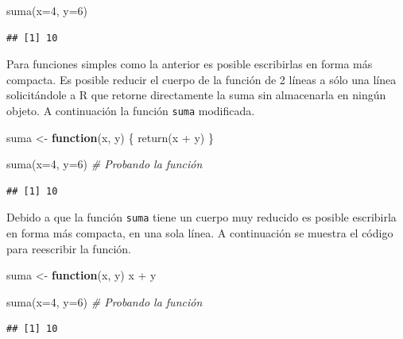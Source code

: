 \documentclass[
]{book}
\makeatletter
\newenvironment{Shaded}{\begin{snugshade}}{\end{snugshade}}
\newcommand{\AttributeTok}[1]{\textcolor[rgb]{0.77,0.63,0.00}{#1}}
\newcommand{\CommentTok}[1]{\textcolor[rgb]{0.56,0.35,0.01}{\textit{#1}}}
\newcommand{\ControlFlowTok}[1]{\textcolor[rgb]{0.13,0.29,0.53}{\textbf{#1}}}
\newcommand{\DecValTok}[1]{\textcolor[rgb]{0.00,0.00,0.81}{#1}}
\newcommand{\FunctionTok}[1]{\textcolor[rgb]{0.00,0.00,0.00}{#1}}
\newcommand{\NormalTok}[1]{#1}
\newcommand{\OtherTok}[1]{\textcolor[rgb]{0.56,0.35,0.01}{#1}}
\newcommand{\SpecialCharTok}[1]{\textcolor[rgb]{0.00,0.00,0.00}{#1}}
\newenvironment{kframe}{%
\medskip{}
\setlength{\fboxsep}{.8em}
 \def\at@end@of@kframe{}%
 \ifinner\ifhmode%
  \def\at@end@of@kframe{\end{minipage}}%
  \begin{minipage}{\columnwidth}%
 \fi\fi%
 \def\FrameCommand##1{\hskip\@totalleftmargin \hskip-\fboxsep
 \colorbox{shadecolor}{##1}\hskip-\fboxsep
     \hskip-\linewidth \hskip-\@totalleftmargin \hskip\columnwidth}%
 \MakeFramed {\advance\hsize-\width
   \@totalleftmargin\z@ \linewidth\hsize
   \@setminipage}}%
 {\par\unskip\endMakeFramed%
 \at@end@of@kframe}
\renewenvironment{Shaded}{\begin{kframe}}{\end{kframe}}
\makeatother
\begin{document}
\begin{Shaded}
\begin{Highlighting}[]
\FunctionTok{suma}\NormalTok{(}\AttributeTok{x=}\DecValTok{4}\NormalTok{, }\AttributeTok{y=}\DecValTok{6}\NormalTok{)}
\end{Highlighting}
\end{Shaded}

\begin{verbatim}
## [1] 10
\end{verbatim}

Para funciones simples como la anterior es posible escribirlas en forma más compacta. Es posible reducir el cuerpo de la función de 2 líneas a sólo una línea solicitándole a R que retorne directamente la suma sin almacenarla en ningún objeto. A continuación la función \texttt{suma} modificada.

\begin{Shaded}
\begin{Highlighting}[]
\NormalTok{suma }\OtherTok{\textless{}{-}} \ControlFlowTok{function}\NormalTok{(x, y) \{}
  \FunctionTok{return}\NormalTok{(x }\SpecialCharTok{+}\NormalTok{ y)}
\NormalTok{\}}

\FunctionTok{suma}\NormalTok{(}\AttributeTok{x=}\DecValTok{4}\NormalTok{, }\AttributeTok{y=}\DecValTok{6}\NormalTok{)  }\CommentTok{\# Probando la función}
\end{Highlighting}
\end{Shaded}

\begin{verbatim}
## [1] 10
\end{verbatim}

Debido a que la función \texttt{suma} tiene un cuerpo muy reducido es posible escribirla en forma más compacta, en una sola línea. A continuación se muestra el código para reescribir la función.

\begin{Shaded}
\begin{Highlighting}[]
\NormalTok{suma }\OtherTok{\textless{}{-}} \ControlFlowTok{function}\NormalTok{(x, y) x }\SpecialCharTok{+}\NormalTok{ y}

\FunctionTok{suma}\NormalTok{(}\AttributeTok{x=}\DecValTok{4}\NormalTok{, }\AttributeTok{y=}\DecValTok{6}\NormalTok{)  }\CommentTok{\# Probando la función}
\end{Highlighting}
\end{Shaded}

\begin{verbatim}
## [1] 10
\end{verbatim}
\end{document}
